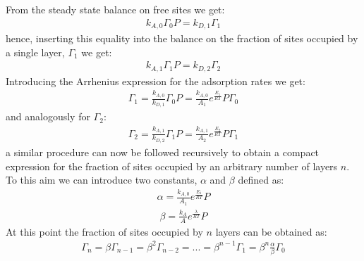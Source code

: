 \documentclass[letterpaper,10pt,english]{jupyterBook}
\begin{document}
\sphinxAtStartPar
From the steady state balance on free sites we get:
\begin{equation}\label{equation:BET_isotherm:BETeq7}
\begin{split}
k_{A,0}\Gamma_0P=k_{D,1}\Gamma_1
\end{split}
\end{equation}
\sphinxAtStartPar
hence, inserting this equality into the balance on the fraction of sites occupied by a single layer, \(\Gamma_1\) we get:
\begin{equation}\label{equation:BET_isotherm:BETeq8}
\begin{split}
k_{A,1}\Gamma_1P=k_{D,2}\Gamma_2
\end{split}
\end{equation}
\sphinxAtStartPar
Introducing the Arrhenius expression for the adsorption rates we get:
\begin{equation}\label{equation:BET_isotherm:BETeq9}
\begin{split}
\Gamma_1=\frac{k_{A,0}}{k_{D,1}}\Gamma_0P=\frac{k_{A,0}}{A_{1}}e^{\frac{E_1}{RT}}P\Gamma_0
\end{split}
\end{equation}
\sphinxAtStartPar
and analogously for \(\Gamma_2\):
\begin{equation}\label{equation:BET_isotherm:BETeq10}
\begin{split}
\Gamma_2=\frac{k_{A,1}}{k_{D,2}}\Gamma_1P=\frac{k_{A,1}}{A_{2}}e^{\frac{E_2}{RT}}P\Gamma_1
\end{split}
\end{equation}
\sphinxAtStartPar
a similar procedure can now be followed recursively to obtain a compact expression for the fraction of sites occupied by an arbitrary number of layers \(n\). To this aim we can introduce two constants, \(\alpha\) and \(\beta\) \sphinxhyphen{} defined as:
\begin{equation}\label{equation:BET_isotherm:BETeq11}
\begin{split}
\alpha=\frac{k_{A,0}}{A_{1}}e^{\frac{E_1}{RT}}P
\end{split}
\end{equation}\begin{equation}\label{equation:BET_isotherm:BETeq12}
\begin{split}
\beta=\frac{k_{A}}{A}e^{\frac{\lambda}{RT}}P
\end{split}
\end{equation}
\sphinxAtStartPar
At this point the fraction of sites occupied by \(n\) layers can be obtained as:
\begin{equation}\label{equation:BET_isotherm:BETeq13}
\begin{split}
\Gamma_n=\beta\Gamma_{n-1}=\beta^2\Gamma_{n-2}=...=\beta^{n-1}\Gamma_{1}=\beta^n\frac{\alpha}{\beta}\Gamma_0
\end{split}
\end{equation}
\end{document}
